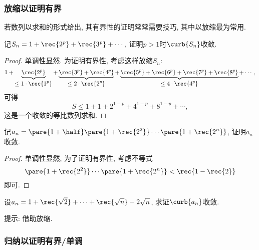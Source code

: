 \documentclass{ctexart}
\begin{document}

\subsubsection{放缩以证明有界} %
\label{ssub:放缩以证明有界}

若数列以求和的形式给出, 其有界性的证明常常需要技巧, 其中以放缩最为常用.
\begin{sample}
    \begin{ex}
        记$S_n = 1+\rec{2^p}+\rec{3^p}+\cdots$, 证明$p>1$时$\curb{S_n}$收敛.
    \end{ex}
    \begin{proof}
        单调性显然. 为证明有界性, 考虑这样放缩$S_n$:
        \[ 1+\underbrace{\rec{2^p}}_{\displaystyle\le 1\cdot\rec{1^p}}+\underbrace{\rec{3^p}+\rec{4^p}}_{\displaystyle\le 2\cdot\rec{2^p}}+\underbrace{\rec{5^p}+\rec{6^p}+\rec{7^p}+\rec{8^p}}_{\displaystyle\le 4\cdot\rec{4^p}}+\cdots, \]
        可得
        \[ S \le 1 + 1 + 2^{1-p} + 4^{1-p} + 8^{1-p} + \cdots, \]
        这是一个收敛的等比数列求和.
    \end{proof}
\end{sample}
\begin{sample}
    \begin{ex}
        记$\displaystyle a_n = \pare{1+\half}\pare{1+\rec{2^2}}\cdots\pare{1+\rec{2^n}}$, 证明$a_n$收敛.
    \end{ex}
    \begin{proof}
        单调性显然, 为了证明有界性, 考虑不等式
        \[ \pare{1+\rec{2^2}}\cdots\pare{1+\rec{2^n}} < \rec{1-\rec{2}} \]
        即可.
    \end{proof}
\end{sample}
\begin{sample}
    \begin{ex}
        设$\displaystyle a_n = 1 + \rec{\sqrt{2}} + \cdots + \rec{\sqrt{n}} - 2\sqrt{n}$, 求证$\curb{a_n}$收敛.
    \end{ex}
    提示: 借助放缩.
\end{sample}


\subsubsection{归纳以证明有界/单调} %
\label{ssub:归纳以证明有界/单调}
\end{document}
